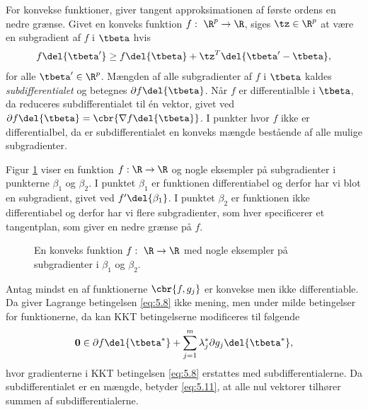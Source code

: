 For konvekse funktioner, giver tangent approksimationen af første ordens en nedre grænse.
Givet en konveks funktion \(f: \ \R^p \rightarrow \R\), siges \(\tz \in \R^p\) at være en subgradient af \(f\) i \(\tbeta\) hvis
\begin{align*}
f \del{\tbeta'} \geq f \del{\tbeta} + \tz^T \del{ \tbeta' - \tbeta}, 
\end{align*}
for alle \(\tbeta' \in \R^p\).
Mængden af alle subgradienter af \(f\) i \(\tbeta\) kaldes \textit{subdifferentialet} og betegnes \(\partial f \del{\tbeta}\).
Når \(f\) er differentialble i \(\tbeta\), da reduceres subdifferentialet til én vektor, givet ved \(\partial f \del{\tbeta} = \cbr{\nabla f \del{\tbeta}}\).
I punkter hvor \(f\) ikke er differentialbel, da er subdifferentialet en konveks mængde bestående af alle mulige subgradienter.

Figur \ref{fig:subgradients} viser en funktion \(f : \R \rightarrow \R\) og nogle eksempler på subgradienter i punkterne \(\beta_1\) og \(\beta_2\).
I punktet \(\beta_1\) er funktionen differentiabel og derfor har vi blot en subgradient, givet ved \(f' \del{\beta_1}\). I punktet \(\beta_2\) er funktionen ikke differentiabel og derfor har vi flere subgradienter, som hver specificerer et tangentplan, som giver en nedre grænse på \(f\).
%
\begin{figure}[H]
\centering
\scalebox{1.2}{}
\caption{En konveks funktion \(f : \ \R \rightarrow \R\) med nogle eksempler på subgradienter i \(\beta_1\) og \(\beta_2\).} \label{fig:subgradients}
\end{figure}
%
Antag mindst en af funktionerne \(\cbr{f, g_j}\) er konvekse men ikke differentiable. Da giver Lagrange betingelsen \eqref{eq:5.8} ikke mening, men under milde betingelser for funktionerne, da kan KKT betingelserne modificeres til følgende
\begin{align}
\mathbf{0} \in \partial f \del{\tbeta^*} + \sum_{j=1}^m \lambda_j^* \partial g_j \del{\tbeta^*}, \label{eq:5.11}
\end{align}
hvor gradienterne i KKT betingelsen \eqref{eq:5.8} erstattes med subdifferentialerne.
Da subdifferentialet er en mængde, betyder \eqref{eq:5.11}, at alle nul vektorer tilhører summen af subdifferentialerne.

